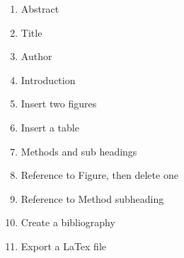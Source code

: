 \documentclass[11pt,american]{article}
\begin{document}
\begin{enumerate}
\item Abstract
\item Title
\item Author
\item Introduction
\item Insert two figures
\item Insert a table
\item Methods and sub headings
\item Reference to Figure, then delete one
\item Reference to Method subheading
\item Create a bibliography
\item Export a LaTex file\end{enumerate}
\end{document}
